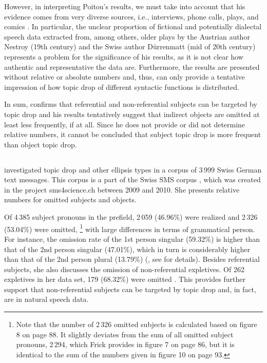 However, in interpreting Poitou's results, we must take into account that his evidence comes from very diverse sources, i.e., interviews, phone calls, plays, and comics \citep[111]{poitou1993}.
In particular, the unclear proportion of fictional and potentially dialectal speech data extracted from, among others, older plays by the Austrian author Nestroy (19th century) and the Swiss author Dürrenmatt (mid of 20th century) represents a problem for the significance of his results, as it is not clear how authentic and representative the data are.
Furthermore, the results are presented without relative or absolute numbers and, thus, can only provide a tentative impression of how topic drop of different syntactic functions is distributed.

In sum, \citet{poitou1993} confirms that referential and non-referential subjects can be targeted by topic drop and his results tentatively suggest that indirect objects are omitted at least less frequently, if at all.
Since he does not provide or did not determine relative numbers, it cannot be concluded that subject topic drop is more frequent than object topic drop.

\subsection{\citet{frick2017}}
\citet[38, 42]{frick2017} investigated topic drop and other ellipsis types in a corpus of 3\,999 Swiss German text messages.
This corpus is a part of the Swiss SMS corpus \citep{ueberwasser2015}, which was created in the project sms4science.ch between 2009 and 2010.
She presents relative numbers for omitted subjects and objects.

Of 4\,385 subject pronouns in the prefield, 2\,059 (46.96\%) were realized and 2\,326 (53.04\%) were omitted,%
\footnote{Note that the number of 2\,326 omitted subjects is calculated based on  figure 8 on page 88.
It slightly deviates from the sum of all omitted subject pronouns, 2\,294, which Frick provides in figure 7 on page 86, but it is identical to the sum of the numbers given in figure 10 on page 93.}
%
with large differences in terms of grammatical person.
For instance, the omission rate of the 1st person singular (59.32\%) is higher than that of the 2nd person singular (47.01\%), which in turn is considerably higher than that of the 2nd person plural (13.79\%) (\cite[88]{frick2017}, see  for details).
Besides referential subjects, she also discusses the omission of non-referential expletives. 
Of 262 expletives in her data set, 179 (68.32\%) were omitted \citep[140]{frick2017}.
This provides further support that non-referential subjects can be targeted by topic drop and, in fact, are in natural speech data.

